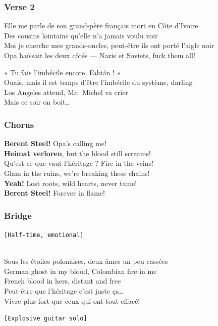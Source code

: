 \documentclass[]{article}
\begin{document}
\subsubsection{Verse 2}\label{verse-2-25}

Elle me parle de son grand-père français mort en Côte d'Ivoire\\
Des cousins lointains qu'elle n'a jamais voulu voir\\
Moi je cherche mes grands-oncles, peut-être ils ont porté l'aigle noir\\
Opa haïssait les deux côtés --- Nazis et Soviets, fuck them all!

« Tu fais l'imbécile encore, Fabián ! »\\
Ouais, mais il est temps d'être l'imbécile du système, darling\\
Los Angeles attend, Mr.~Michel va crier\\
Mais ce soir on boit\ldots{}

\subsubsection{Chorus}\label{chorus-87}

\textbf{Berent Steel!} Opa's calling me!\\
\textbf{Heimat verloren}, but the blood still screams!\\
Qu'est-ce que vaut l'héritage ? Fire in the veins!\\
Glam in the ruins, we're breaking these chains!\\
\textbf{Yeah!} Lost roots, wild hearts, never tame!\\
\textbf{Berent Steel!} Forever in flame!

\subsubsection{Bridge}\label{bridge-25}

\texttt{{[}Half-time,\ emotional{]}}\strut \\
Sous les étoiles polonaises, deux âmes un peu cassées\\
German ghost in my blood, Colombian fire in me\\
French blood in hers, distant and free\\
Peut-être que l'héritage c'est juste ça\ldots{}\\
Vivre plus fort que ceux qui ont tout effacé!

\texttt{{[}Explosive\ guitar\ solo{]}}
\end{document}
